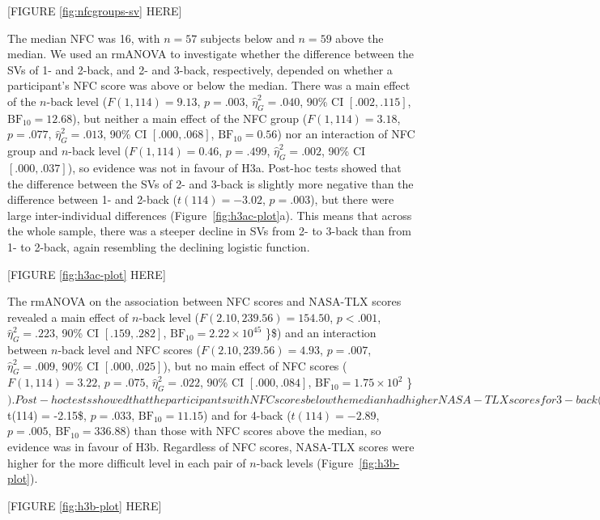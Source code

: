 \documentclass[
  man,floatsintext]{apa6}
\begin{document}
{[}FIGURE \ref{fig:nfcgroups-sv} HERE{]}

The median NFC was 16, with \(n=57\) subjects below and \(n=59\) above the median.
We used an rmANOVA to investigate whether the difference between the SVs of 1- and 2-back, and 2- and 3-back, respectively, depended on whether a participant's NFC score was above or below the median.
There was a main effect of the \(n\)-back level (\(F(1, 114) = 9.13\), \(p = .003\), \(\hat{\eta}^2_G = .040\), 90\% CI \([.002, .115]\), \(\mathrm{BF}_{\textrm{10}} = 12.68\)), but neither a main effect of the NFC group (\(F(1, 114) = 3.18\), \(p = .077\), \(\hat{\eta}^2_G = .013\), 90\% CI \([.000, .068]\), \(\mathrm{BF}_{\textrm{10}} = 0.56\)) nor an interaction of NFC group and \(n\)-back level (\(F(1, 114) = 0.46\), \(p = .499\), \(\hat{\eta}^2_G = .002\), 90\% CI \([.000, .037]\)), so evidence was not in favour of H3a.
Post-hoc tests showed that the difference between the SVs of 2- and 3-back is slightly more negative than the difference between 1- and 2-back (\(t(114) = -3.02\), \(p = .003\)), but there were large inter-individual differences (Figure~\ref{fig:h3ac-plot}a).
This means that across the whole sample, there was a steeper decline in SVs from 2- to 3-back than from 1- to 2-back, again resembling the declining logistic function.

{[}FIGURE \ref{fig:h3ac-plot} HERE{]}

The rmANOVA on the association between NFC scores and NASA-TLX scores revealed a main effect of \(n\)-back level (\(F(2.10, 239.56) = 154.50\), \(p < .001\), \(\hat{\eta}^2_G = .223\), 90\% CI \([.159, .282]\), \(\mathrm{BF}_{\textrm{10}} = 2.22 \times 10^{45}\) \}\$) and an interaction between \(n\)-back level and NFC scores (\(F(2.10, 239.56) = 4.93\), \(p = .007\), \(\hat{\eta}^2_G = .009\), 90\% CI \([.000, .025]\)), but no main effect of NFC scores (\(F(1, 114) = 3.22\), \(p = .075\), \(\hat{\eta}^2_G = .022\), 90\% CI \([.000, .084]\), \(\mathrm{BF}_{\textrm{10}} = 1.75 \times 10^{2}\) \}\(). Post-hoc tests showed that the participants with NFC scores below the median had higher NASA-TLX scores for 3-back (\)t(114) = -2.15\$, \(p = .033\), \(\mathrm{BF}_{\textrm{10}} = 11.15\)) and for 4-back (\(t(114) = -2.89\), \(p = .005\), \(\mathrm{BF}_{\textrm{10}} = 336.88\)) than those with NFC scores above the median, so evidence was in favour of H3b.
Regardless of NFC scores, NASA-TLX scores were higher for the more difficult level in each pair of \(n\)-back levels (Figure~\ref{fig:h3b-plot}).

{[}FIGURE \ref{fig:h3b-plot} HERE{]}
\end{document}

